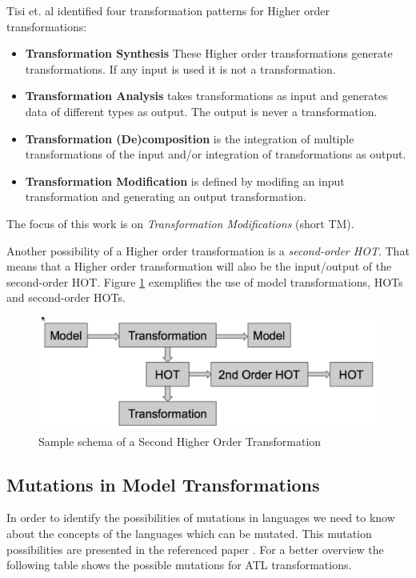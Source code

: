 \documentclass{llncs}
\begin{document}
Tisi et. al \cite{Tisi:2009} identified four transformation patterns for Higher
order transformations:

\begin{itemize}
	\item \textbf{Transformation Synthesis} These Higher order transformations
	generate transformations. If any input is used it is not a transformation.
	\item \textbf{Transformation Analysis} takes transformations as input and generates data of different types as output. The output is never a transformation.
	\item \textbf{Transformation (De)composition} is the integration of multiple transformations of the input and/or integration of transformations as output.
	\item \textbf{Transformation Modification} is defined by modifing an input transformation and generating an output transformation.
\end{itemize}

The focus of this work is on \textit{Transformation Modifications} (short TM). 

Another possibility of a Higher order transformation is a \textit{second-order HOT}. That means that a Higher order transformation will also be the
input/output of the second-order HOT. Figure \ref{fig:second_order} exemplifies
the use of model transformations, HOTs and second-order HOTs.

\begin{figure}
	\centering
	\includegraphics[width=1\textwidth,natwidth=610,natheight=642]{figures/SecondOrderHOT.pdf}
	\caption{Sample schema of a Second Higher Order
	Transformation}
	\label{fig:second_order}
\end{figure}

\subsection{Mutations in Model Transformations}
In order to identify the possibilities of mutations in languages we need to know
about the concepts of the languages which can be mutated. This mutation possibilities
are presented in the referenced paper \cite{troya:2015}. For a better overview
 the following table shows the possible mutations for ATL
transformations.\label{fig:mutations_ATL}
\end{document}
